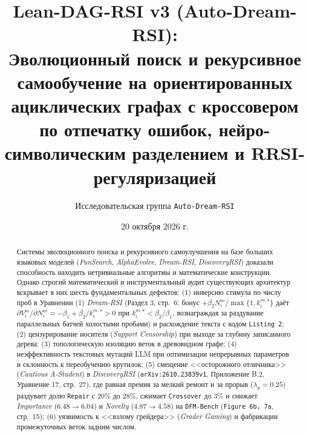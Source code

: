 \documentclass[11pt,a4paper]{article}
\title{\textbf{Lean-DAG-RSI v3 (Auto-Dream-RSI):\\
Эволюционный поиск и рекурсивное самообучение на ориентированных ациклических графах с кроссовером по отпечатку ошибок, нейро-символическим разделением и RRSI-регуляризацией}}
\author{Исследовательская группа \texttt{Auto-Dream-RSI}}
\date{20 октября 2026 г.}
\begin{document}
\maketitle

\begin{abstract}
Системы эволюционного поиска и рекурсивного самоулучшения на базе больших языковых моделей (\emph{FunSearch}, \emph{AlphaEvolve}, \emph{Dream-RSI}, \emph{DiscoveryRSI}) доказали способность находить нетривиальные алгоритмы и математические конструкции. Однако строгий математический и инструментальный аудит существующих архитектур вскрывает в них шесть фундаментальных дефектов: (1) инверсию стимула по числу проб в Уравнении (1) \emph{Dream-RSI} (Раздел 3, стр.~6: бонус $+\beta_2 N_i^m / \max\{1, k_i^{m,\star}\}$ даёт $\partial V_i^m / \partial N_i^m = -\beta_1 + \beta_2 / k_i^{m,\star} > 0$ при $k_i^{m,\star} < \beta_2/\beta_1$, вознаграждая за раздувание параллельных батчей холостыми пробами) и расхождение текста с кодом \texttt{Listing 2}; (2) цензурирование носителя (\emph{Support Censorship}) при выходе за глубину записанного дерева; (3) топологическую изоляцию веток в древовидном графе; (4) неэффективность текстовых мутаций LLM при оптимизации непрерывных параметров и склонность к переобучению крутилок; (5) смещение <<осторожного отличника>> (\emph{Cautious A-Student}) в \emph{DiscoveryRSI} (\texttt{arXiv:2610.23839v1}, Приложение B.2, Уравнение 17, стр.~27), где равная премия за мелкий ремонт и за прорыв ($\lambda_p = 0.25$) раздувает долю \texttt{Repair} с $20\%$ до $28\%$, сжимает \texttt{Crossover} до $3\%$ и снижает \emph{Importance} ($6.48 \to 6.04$) и \emph{Novelty} ($4.87 \to 4.58$) на \texttt{DFM-Bench} (\texttt{Figure 6b, 7a}, стр.~15); (6) уязвимость к <<взлому грейдера>> (\emph{Grader Gaming}) и фабрикации промежуточных веток задним числом.


\end{abstract}
\end{document}
